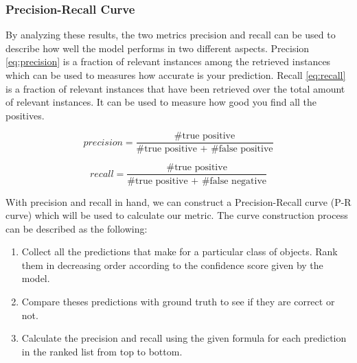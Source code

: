 \subsubsection{Precision-Recall Curve}
\label{sec:Eval-pr-curve}

By analyzing these results, the two metrics precision and recall can be
used to describe how well the model performs in two different aspects.
Precision \autoref{eq:precision} is a fraction of relevant instances among the
retrieved instances which can be used to measures how accurate is your
prediction.
Recall \autoref{eq:recall} is a fraction of relevant instances that have been
retrieved over the total amount of relevant instances. It can be used to
measure how good you find all the positives.

\begin{equation}
\label{eq:precision}
\mathit{precision} =
\frac
{\text{\# true positive}}
{\text{\# true positive + \# false positive}}
\end{equation}

\begin{equation}
\label{eq:recall}
\mathit{recall} =
\frac
{\text{\# true positive}}
{\text{\# true positive + \# false negative}}
\end{equation}


With precision and recall in hand, we can construct a Precision-Recall curve
(P-R curve) which will be used to calculate our metric. The curve
construction process can be described as the following:

\begin{enumerate}
    \item Collect all the predictions that make for a particular class of
    objects. Rank them in decreasing order according to the confidence score
    given by the model.
    \item  Compare theses predictions with ground truth to see if they are correct
    or not.
    \item Calculate the precision and recall using the given formula for each
    prediction in the ranked list from top to bottom.
\end{enumerate}

